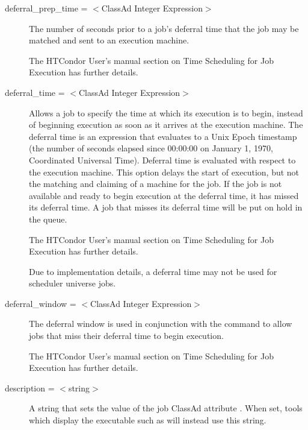 \begin{description}

\label{condor-submit-deferral-prep-time}
\item[deferral\_prep\_time = $<$ClassAd Integer Expression$>$]
The number of seconds prior to a job's deferral time that
the job may be matched and sent to an execution machine.

The HTCondor User's manual section on Time Scheduling for Job Execution
has further details.


\label{condor-submit-deferral-time}
\item[deferral\_time = $<$ClassAd Integer Expression$>$]
Allows a job to specify the time at which its execution
is to begin,
instead of beginning execution as soon as it arrives at the execution
machine. The deferral time is an expression that 
evaluates to a Unix Epoch timestamp (the number of
seconds elapsed since 00:00:00 on January 1, 1970, Coordinated
Universal Time). 
Deferral time is evaluated with respect to the execution machine.
This option delays the start of
execution, but not the matching and claiming of
a machine for the job.
If the job is not available and ready to begin
execution at the deferral time, it has missed its deferral time.
A job that misses its deferral time will be put on hold
in the queue. 

The HTCondor User's manual section on Time Scheduling for Job Execution
has further details.

Due to implementation details,
a deferral time may not be used for scheduler universe jobs.


\label{condor-submit-deferral-window}
\item[deferral\_window = $<$ClassAd Integer Expression$>$]
The deferral window is used in conjunction with the
 command to allow jobs that
miss their deferral time to begin execution.

The HTCondor User's manual section on Time Scheduling for Job Execution
has further details.


\label{condor-submit-description}
\item[description = $<$string$>$]
A string that sets the value of the job ClassAd attribute
.
When set, tools which display the executable such as 
will instead use this string.


\end{description}
